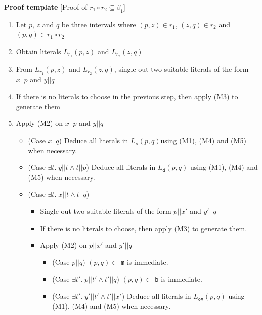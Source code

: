 \documentclass{llncs}
\begin{document}
\begin{flushleft}
\textbf{Proof template}  [Proof of $r_1 \circ  r_2 \subseteq \beta_1$]
\end{flushleft}
\begin{enumerate}
\item Let $p$, $z$ and $q$ be three intervals where $(p,z) \in r_1$, $(z,q) \in r_2$ and $(p,q) \in r_1 \circ r_2$ 
\item Obtain literals  $L_{r_1}(p,z)$ and $L_{r_2}(z,q)$
\item From $L_{r_1}(p,z)$ and $L_{r_2}(z,q)$, single out two suitable literals of the form $x||p$ and $y||q$
\item If there is no literals to choose in the previous step, then apply (M3) to generate them

\item Apply (M2) on $x||p$ and $y||q$ %
\begin{itemize}
\item[] (Case $x||q$) Deduce all literals in $L_\texttt{s}(p,q)$using (M1), (M4) and (M5) when necessary. %
\item[] (Case $\exists t.\;y||t\land t||p$)
Deduce all literals in $L_\texttt{d}(p,q)$ using (M1), (M4) and (M5) when necessary.  %
\item[] (Case $\exists t.\;x||t\land t||q$) 
\begin{itemize}
\item[5.1] Single out two suitable literals of the form $p||x'$ and $y'||q$
\item[5.2] If there is no literals to choose, then apply (M3) to generate them.
\item[5.3] Apply (M2) on $p||x'$ and $y'||q$
\begin{itemize}
\item[] (Case $p||q$) $(p,q) \in $ \texttt{m} is immediate. %
\item[] (Case $\exists t'.\;p||t'\land t'||q$) $(p,q) \in $ \texttt{b} is immediate.
\item[] (Case $\exists t'.\;y'||t'\land t'||x'$) Deduce all literals in $L_\texttt{ov}(p,q)$ using (M1), (M4) and (M5) when necessary.  %
\end{itemize}
\end{itemize}
\end{itemize}
\end{enumerate}
\end{document}
